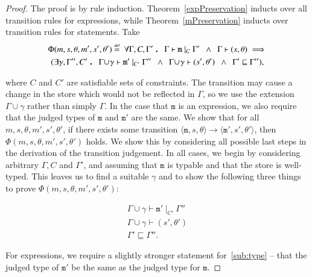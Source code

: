 \documentclass[12pt,a4paper,twoside,openright]{report}
\theoremstyle{definition}
\theoremstyle{dotless}
\newcommand{\transition}[6]{\langle{}\mathtt{#1},#2,#3\rangle{}\rightarrow{}\langle{}\mathtt{#4},#5,#6\rangle}
\newcommand\eqdef{\mathrel{\overset{\makebox[0pt]{\mbox{\normalfont\tiny def}}}{=}}}
\newcommand\qdot{\mathbin{\scalebox{1.5}{.}}\enspace}
\begin{document}
\begin{proof}
  The proof is by rule induction. Theorem~\ref{expPreservation} inducts over all
  transition rules for expressions, while Theorem~\ref{mPreservation} inducts over
  transition rules for statements. Take 
  \begin{multline*}
 	\Phi(m, s, \theta, m', s', \theta') \eqdef 
	\	\forall\Gamma,C,\Gamma' \qdot
	\Gamma\vdash\mathtt{m}\ |_C\ \Gamma' 
	\enspace\land\enspace\Gamma\vdash (s,\theta)
	\implies \\
   	(\exists\gamma,\Gamma'',C'\qdot
    \Gamma\!\cup\!\gamma\vdash \mathtt{m'}\ |_{C'}\ \Gamma'' 
	\enspace\land\enspace\Gamma\!\cup\!\gamma\vdash (s',\theta')
	\enspace\land\enspace \Gamma'\sqsubseteq\Gamma''),
  \end{multline*} 

  where $C$ and $C'$ are satisfiable sets of constraints. The transition may
  cause a change in the store which would not be reflected in $\Gamma$, so we
  use the extension $\Gamma\!\cup\!\gamma$ rather than simply $\Gamma$. In the
  case that $\mathtt{m}$ is an expression, we also require that the judged
  types of $\mathtt{m}$ and $\mathtt{m'}$ are the same. We show that for all
  $m, s, \theta, m', s', \theta'$, if there exists some transition
  $\transition{m}{s}{\theta}{m'}{s'}{\theta'}$, then
  $\Phi(m,s,\theta,m',s',\theta')$ holds. We show this by considering all
  possible last steps in the derivation of the transition judgement. In all
  cases, we begin by considering arbitrary $\Gamma, C$ and $\Gamma'$, and
  assuming that $\mathtt{m}$ is typable and that the store is well-typed. This leaves us to find
  a suitable $\gamma$ and to show the following three things to prove $\Phi(m,s,\theta,m',s',\theta')$:

  \begin{gather}
	\Gamma\!\cup\!\gamma\vdash\mathtt{m'}\ |_{C'}\ \Gamma'' \label{sub:type}\\
	\Gamma\!\cup\!\gamma\vdash(s',\theta') \label{sub:store} \\
	\Gamma' \sqsubseteq \Gamma'' \label{sub:env}.
  \end{gather}

  For expressions, we require a slightly stronger statement for~\eqref{sub:type} -- that
  the judged type of $\mathtt{m'}$ be the same as the judged type for $\mathtt{m}$.


\end{proof}
\end{document}
